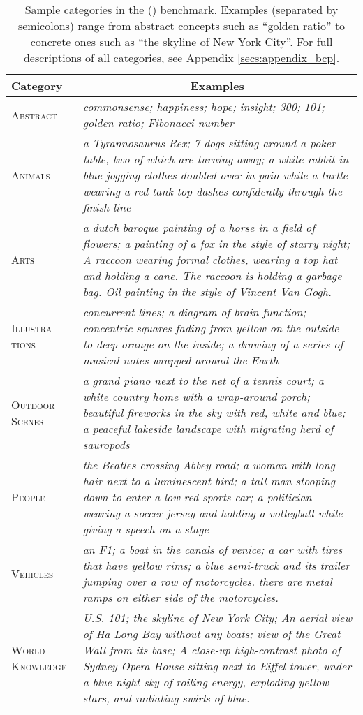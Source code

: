 \begin{table*}
\centering
\renewcommand{\arraystretch}{1.5}
{\footnotesize
\begin{tabular}{p{1.5cm}p{11.5cm}}
\toprule
Category & \multicolumn{1}{c}{Examples} \\
\midrule
\textsc{Abstract} & \textit{commonsense; happiness; hope; insight; 300; 101; golden ratio; Fibonacci number} \\
\textsc{Animals} & \textit{a Tyrannosaurus Rex; 7 dogs sitting around a poker table, two of which are turning away; a white rabbit in blue jogging clothes doubled over in pain while a turtle wearing a red tank top dashes confidently through the finish line} \\
\textsc{Arts} & \textit{a dutch baroque painting of a horse in a field of flowers; a painting of a fox in the style of starry night; A raccoon wearing formal clothes, wearing a top hat and holding a cane. The raccoon is holding a garbage bag. Oil painting in the style of Vincent Van Gogh.} \\
\textsc{Illustra- tions} & \textit{concurrent lines; a diagram of brain function; concentric squares fading from yellow on the outside to deep orange on the inside; a drawing of a series of musical notes wrapped around the Earth} \\
\textsc{Outdoor Scenes} & \textit{a grand piano next to the net of a tennis court; a white country home with a wrap-around porch; beautiful fireworks in the sky with red, white and blue; a peaceful lakeside landscape with migrating herd of sauropods} \\
\textsc{People} & \textit{the Beatles crossing Abbey road; a woman with long hair next to a luminescent bird; a tall man stooping down to enter a low red sports car; a politician wearing a soccer jersey and holding a volleyball while giving a speech on a stage} \\
\textsc{Vehicles} & \textit{an F1; a boat in the canals of venice; a car with tires that have yellow rims; a blue semi-truck and its trailer jumping over a row of motorcycles. there are metal ramps on either side of the motorcycles.} \\
\textsc{World Knowledge} & \textit{U.S. 101; the skyline of New York City; An aerial view of Ha Long Bay without any boats; view of the Great Wall from its base; A close-up high-contrast photo of Sydney Opera House sitting next to Eiffel tower, under a blue night sky of roiling energy, exploding yellow stars, and radiating swirls of blue.} \\
\bottomrule
\end{tabular}
}
\caption{Sample categories in the \bcp{} (\bcpa{}) benchmark. Examples (separated by semicolons) range from abstract concepts such as ``golden ratio'' to concrete ones such as ``the skyline of New York City''. For full descriptions of all categories, see Appendix \ref{secs:appendix_bcp}.}
\label{t:bcp_categories}
\end{table*}
